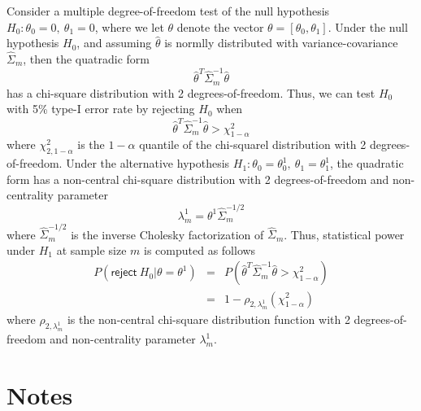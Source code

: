 \documentclass{article}
\begin{document}
Consider a multiple degree-of-freedom test of the null hypothesis $H_0: \theta_0 = 0,\ \theta_1 = 0$, where we let $\theta$ denote the vector $\theta = [\theta_0, \theta_1]$. Under the null hypothesis $H_0$, and assuming $\hat{\theta}$ is normlly distributed with variance-covariance $\hat{\Sigma}_m$,  then the quatradic form
$$
\hat{\theta}^T\hat{\Sigma}_m^{-1}\hat{\theta}
$$
 has a chi-square distribution with 2 degrees-of-freedom. Thus, we can test $H_0$ with 5\% type-I error rate by rejecting $H_0$ when 
$$
\hat{\theta}^T\hat{\Sigma}_m^{-1}\hat{\theta} > \chi^2_{1-\alpha}
$$
where $\chi^2_{2,1-\alpha}$ is the $1-\alpha$ quantile of the chi-squarel distribution with 2 degrees-of-freedom. Under the alternative hypothesis $H_1: \theta_0 = \theta_0^1,\ \theta_1 = \theta_1^1$, the quadratic form has a non-central chi-square distribution with 2 degrees-of-freedom and non-centrality parameter
$$
\lambda^1_m = \theta^1 \hat{\Sigma}_m^{-1/2}
$$
where $\hat{\Sigma}_m^{-1/2}$ is the inverse Cholesky factorization of $\hat{\Sigma}_m$. Thus, statistical power under $H_1$ at sample size $m$ is computed as follows
\begin{eqnarray}
P(\mathsf{reject}\ H_0 | \theta = \theta^1) &=& P\left(\hat{\theta}^T\hat{\Sigma}_m^{-1}\hat{\theta} > \chi^2_{1-\alpha}\right) \nonumber \\
&=& 1-\rho_{2,\lambda^1_m}\left(\chi^2_{1-\alpha}\right) \nonumber
\end{eqnarray}
where $\rho_{2,\lambda^1_m}$ is the non-central chi-square distribution function with 2 degrees-of-freedom and non-centrality parameter $\lambda^1_m$.
\section{Notes}
\end{document}
